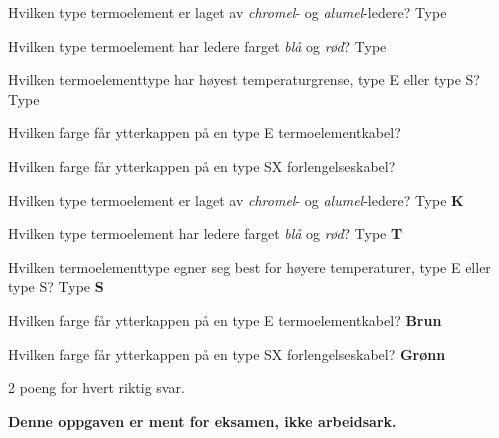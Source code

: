 

Hvilken type termoelement er laget av {\it chromel}- og {\it alumel}-ledere? Type \underbar{\hskip 50pt}

\vskip 10pt

Hvilken type termoelement har ledere farget {\it blå} og {\it rød}? Type \underbar{\hskip 50pt}

\vskip 10pt

Hvilken termoelementtype har høyest temperaturgrense, type E eller type S? Type \underbar{\hskip 50pt}

\vskip 10pt

Hvilken farge får ytterkappen på en type E termoelementkabel? \underbar{\hskip 50pt}

\vskip 10pt

Hvilken farge får ytterkappen på en type SX forlengelseskabel? \underbar{\hskip 50pt}







Hvilken type termoelement er laget av {\it chromel}- og {\it alumel}-ledere? Type {\bf K}

\vskip 10pt

Hvilken type termoelement har ledere farget {\it blå} og {\it rød}? Type {\bf T}

\vskip 10pt

Hvilken termoelementtype egner seg best for høyere temperaturer, type E eller type S? Type {\bf S}

\vskip 10pt

Hvilken farge får ytterkappen på en type E termoelementkabel? {\bf Brun}

\vskip 10pt

Hvilken farge får ytterkappen på en type SX forlengelseskabel? {\bf Grønn}

\vskip 10pt

2 poeng for hvert riktig svar.







{\bf Denne oppgaven er ment for eksamen, ikke arbeidsark.}


